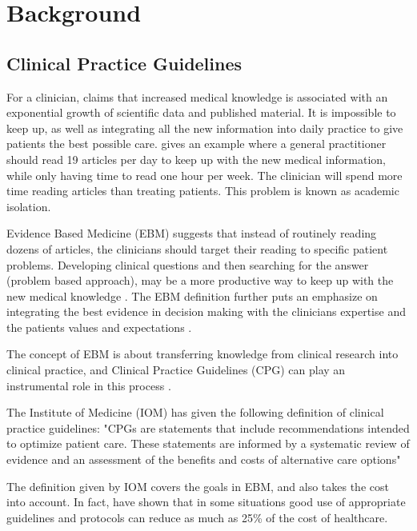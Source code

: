 \chapter{Background}
\section{Clinical Practice Guidelines}
For a clinician, \textcite{Fervers2010} claims that increased medical knowledge is associated with an exponential growth of scientific data and published material. It is impossible to keep up, as well as integrating all the new information into daily practice to give patients the best possible care.  \textcite{Masic2008} gives an example where a general practitioner should read 19 articles per day to keep up with the new medical information, while only having time to read one hour per week. The clinician will spend more time reading articles than treating patients. This problem is known as academic isolation.

Evidence Based Medicine (EBM) suggests that instead of routinely reading dozens of articles, the clinicians should target their reading to specific patient problems. Developing clinical questions and then searching for the answer (problem based approach), may be a more productive way to keep up with the new medical knowledge \parencite{Masic2008}. The EBM definition further puts an emphasize on integrating the best evidence in decision making with the clinicians expertise and the patients values and expectations \parencite{Masic2008}. 

The concept of EBM is about transferring knowledge from clinical research into clinical practice, and Clinical Practice Guidelines (CPG) can play an instrumental role in this process \parencite{Fervers2010}.

The Institute of Medicine (IOM) has given the following definition of clinical practice guidelines: "CPGs are statements that include recommendations intended to optimize patient care. These statements are informed by a systematic review of evidence and an assessment of the benefits and costs of alternative care options" \parencite{Guidelines2011}

The definition given by IOM covers the goals in EBM, and also takes the cost into account. In fact, \textcite{Clayton1995} have shown that in some situations good use of appropriate guidelines and protocols can reduce as much as 25\% of the cost of healthcare.


